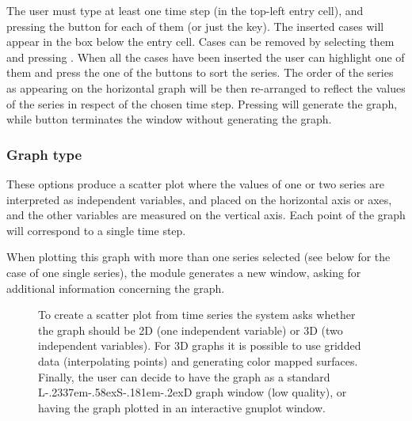 \documentclass [11pt,a4paper] {book}
\def\LsD{{L\kern-.2337em\lower-.58ex\hbox{S}\kern-.181em\lower-.2ex\hbox{D}}\xspace}
\begin{document}
The user must type at least one time step (in the top-left entry cell), and pressing the button  for each of them (or just the  key). The inserted cases will appear in the box below the entry cell. Cases can be removed by selecting them and pressing . When all the cases have been inserted the user can highlight one of them and press the one of the buttons to sort the series. The order of the series as appearing on the horizontal graph will be then re-arranged to reflect the values of the series in respect of the chosen time step.
Pressing  will generate the graph, while button  terminates the window without generating the graph.

\subsubsection{Graph type }

These options produce a scatter plot where the values of one or two series are interpreted as independent variables, and placed on the horizontal axis or axes, and the other variables are measured on the vertical axis. Each point of the graph will correspond to a single time step.

When plotting this graph with more than one series selected (see below for the case of one single series), the module generates a new window, asking for additional information concerning the graph.

\begin{figure}[ht]
  \centering
  \caption{\small To create a scatter plot from time series the system asks whether the graph should be 2D (one independent variable) or 3D (two independent variables). For 3D graphs it is possible to use gridded data (interpolating points) and generating color mapped surfaces. Finally, the user can decide to have the graph as a standard \LsD graph window (low quality), or having the graph plotted in an interactive gnuplot window.}
  \label{fig:23d_time}
\end{figure}
\end{document}
